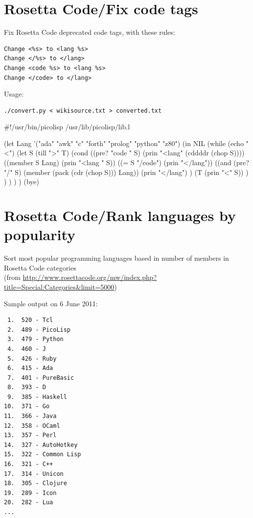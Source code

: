 \pagebreak{}
\section*{Rosetta Code/Fix code tags}

Fix Rosetta Code deprecated code tags, with these rules:

\begin{verbatim}
Change <%s> to <lang %s>
Change </%s> to </lang>
Change <code %s> to <lang %s>
Change </code> to </lang>
\end{verbatim}

Usage:

\begin{verbatim}
./convert.py < wikisource.txt > converted.txt
\end{verbatim}

\begin{wideverbatim}

#!/usr/bin/picolisp /usr/lib/picolisp/lib.l

(let Lang '("ada" "awk" "c" "forth" "prolog" "python" "z80")
   (in NIL
      (while (echo "<")
         (let S (till ">" T)
            (cond
               ((pre? "code " S) (prin "<lang" (cddddr (chop S))))
               ((member S Lang) (prin "<lang " S))
               ((= S "/code") (prin "</lang"))
               ((and (pre? "/" S) (member (pack (cdr (chop S))) Lang))
                  (prin "</lang") )
               (T (prin "<" S)) ) ) ) ) )
(bye)

\end{wideverbatim}

\pagebreak{}
\section*{Rosetta Code/Rank languages by popularity}

Sort most popular programming languages based in number of members in
Rosetta Code categories \\ (from
\href{http://www.rosettacode.org/mw/index.php?title=Special:Categories\&limit=5000}{http://www.rosettacode.org/mw/index.php?title=Special:Categories\&limit=5000})

Sample output on 6 June 2011:

\begin{verbatim}
 1.  520 - Tcl
 2.  489 - PicoLisp
 3.  479 - Python
 4.  460 - J
 5.  426 - Ruby
 6.  415 - Ada
 7.  401 - PureBasic
 8.  393 - D
 9.  385 - Haskell
10.  371 - Go
11.  366 - Java
12.  358 - OCaml
13.  357 - Perl
14.  327 - AutoHotkey
15.  322 - Common Lisp
16.  321 - C++
17.  314 - Unicon
18.  305 - Clojure
19.  289 - Icon
20.  282 - Lua
...
\end{verbatim}

